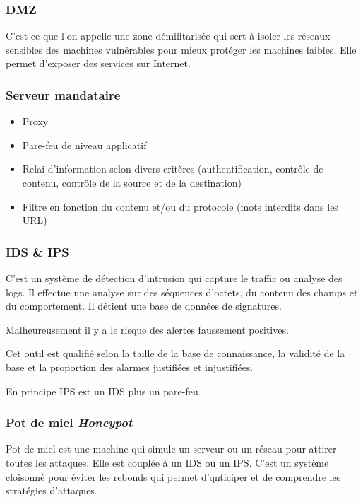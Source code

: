 \documentclass[12pt, a4paper]{article}
\begin{document}
	\subsubsection{DMZ}
	C'est ce que l'on appelle une zone démilitarisée qui sert à isoler les réseaux
	 sensibles des machines vulnérables pour mieux protéger les machines faibles.
	Elle permet d'exposer des services sur Internet.
	\subsubsection{Serveur mandataire}
	\begin{itemize}
		\item Proxy
		\item Pare-feu de niveau applicatif
		\item Relai d'information selon divers critères (authentification, contrôle
		de contenu, contrôle de la source et de la destination)
		\item Filtre en fonction du contenu et/ou du protocole (mots interdits dans
		les URL)
	\end{itemize}
	\subsubsection{IDS \& IPS}
	C'est un système de détection d'intrusion qui capture le traffic ou analyse
	des logs. Il effectue une analyse sur des séquences d'octets, du contenu des
	champs et du comportement. Il détient une base de données de signatures.
	\par
	Malheureusement il y a le risque des alertes faussement positives.
	\par
	Cet outil est qualifié selon la taille de la base de connaissance, la validité
	 de la base et la proportion des alarmes justifiées et injustifiées.
	\par
	En principe IPS est un IDS plus un pare-feu.
	\subsubsection{Pot de miel \textit{Honeypot}}
	Pot de miel est une machine qui simule un serveur ou un réseau pour attirer
	toutes les attaques. Elle est couplée à un IDS ou un IPS. C'est un système
	cloisonné pour éviter les rebonds qui permet d'qnticiper et de comprendre les
	stratégies d'attaques.
\end{document}
